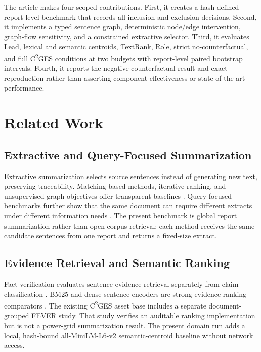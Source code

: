 \documentclass[applsci,article,submit,moreauthors]{Definitions/mdpi}
\newcommand{\cges}{C\textsuperscript{2}GES}
\begin{document}
The article makes four scoped contributions. First, it creates a hash-defined report-level benchmark that records all inclusion and exclusion decisions. Second, it implements a typed sentence graph, deterministic node/edge intervention, graph-flow sensitivity, and a constrained extractive selector. Third, it evaluates Lead, lexical and semantic centroids, TextRank, Role, strict no-counterfactual, and full \cges{} conditions at two budgets with report-level paired bootstrap intervals. Fourth, it reports the negative counterfactual result and exact reproduction rather than asserting component effectiveness or state-of-the-art performance.

\section{Related Work}

\subsection{Extractive and Query-Focused Summarization}

Extractive summarization selects source sentences instead of generating new text, preserving traceability. Matching-based methods, iterative ranking, and unsupervised graph objectives offer transparent baselines \cite{zhong2020extractive,bi2021aredsum,liu2021unsupervised}. Query-focused benchmarks further show that the same document can require different extracts under different information needs \cite{zhong2021qmsum,vig2022exploring}. The present benchmark is global report summarization rather than open-corpus retrieval: each method receives the same candidate sentences from one report and returns a fixed-size extract.

\subsection{Evidence Retrieval and Semantic Ranking}

Fact verification evaluates sentence evidence retrieval separately from claim classification \cite{thorne2018fever}. BM25 and dense sentence encoders are strong evidence-ranking comparators \cite{robertson2009probabilistic,reimers2019sentencebert}. The existing \cges{} asset base includes a separate document-grouped FEVER study. That study verifies an auditable ranking implementation but is not a power-grid summarization result. The present domain run adds a local, hash-bound all-MiniLM-L6-v2 semantic-centroid baseline without network access.
\end{document}
